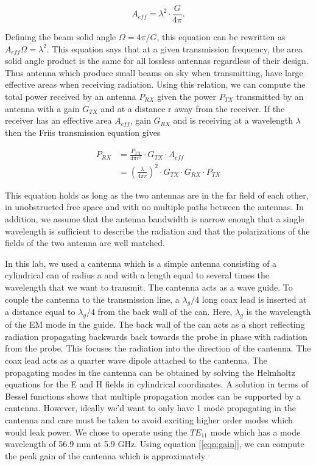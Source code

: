 \documentclass{article}
\begin{document}
\begin{equation}
    A_{eff} = \lambda^2 \cdot \frac{G}{4 \pi}.
    \label{eqn:gain}
\end{equation}

Defining the beam solid angle $\Omega = 4\pi/G$, this equation can be rewritten as $A_{eff} \Omega = \lambda^2$. This equation says that at a given transmission frequency, the area solid angle product is the same for all lossless antennas regardless of their design. Thus antenna which produce small beams on sky when transmitting, have large effective areas when receiving radiation. Using this relation, we can compute the total power received by an antenna $P_{RX}$ given the power $P_{TX}$ transmitted by an antenna with a gain $G_{TX}$ and at a distance r away from the receiver. If the receiver has an effective area $A_{eff}$, gain $G_{RX}$ and is receiving at a wavelength $\lambda$ then the Friis transmission equation gives

\begin{align}
    P_{RX} &= \frac{P_{TX}}{4 \pi r^2} \cdot G_{TX} \cdot A_{eff} \\
           &= \left(\frac{\lambda}{4 \pi r}\right)^2 \cdot G_{TX} \cdot G_{RX} \cdot P_{TX}
\label{eqn:friis}
\end{align}

This equation holds as long as the two antennas are in the far field of each other, in unobstructed free space and with no multiple paths between the antennas. In addition, we assume that the antenna bandwidth is narrow enough that a single wavelength is sufficient to describe the radiation and that the polarizations of the fields of the two antenna are well matched.

In this lab, we used a cantenna which is a simple antenna consisting of a cylindrical can of radius a and with a length equal to several times the wavelength that we want to transmit. The cantenna acts as a wave guide. To couple the cantenna to the transmission line, a  $\lambda_g/4$ long coax lead is inserted at a distance equal to $\lambda_g/4$ from the back wall of the can. Here, $\lambda_g$ is the wavelength of the EM mode in the guide. The back wall of the can acts as a short reflecting radiation propagating backwards back towards the probe in phase with radiation from the probe. This focuses the radiation into the direction of the cantenna. The coax lead acts as a quarter wave dipole attached to the cantenna. The propagating modes in the cantenna can be obtained by solving the Helmholtz equations for the E and H fields in cylindrical coordinates. A solution in terms of Bessel functions shows that multiple propagation modes can be supported by a cantenna. However, ideally we'd want to only have 1 mode propagating in the cantenna and care must be taken to avoid exciting higher order modes which would leak power. We chose to operate using the $TE_{11}$ mode which has a mode wavelength of 56.9 mm at 5.9 GHz. Using equation [\ref{eqn:gain}], we can compute the peak gain of the cantenna which is approximately 
\end{document}
